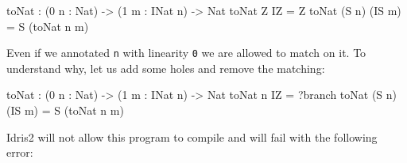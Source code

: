 \documentclass[
]{article}
\newenvironment{Shaded}{}{}
\newcommand{\DataTypeTok}[1]{\textcolor[rgb]{0.56,0.13,0.00}{#1}}
\newcommand{\DecValTok}[1]{\textcolor[rgb]{0.25,0.63,0.44}{#1}}
\newcommand{\NormalTok}[1]{#1}
\newcommand{\OperatorTok}[1]{\textcolor[rgb]{0.40,0.40,0.40}{#1}}
\newcommand{\OtherTok}[1]{\textcolor[rgb]{0.00,0.44,0.13}{#1}}
\begin{document}
\begin{Shaded}
\begin{Highlighting}[]
\NormalTok{toNat }\OperatorTok{:}\NormalTok{ (}\DecValTok{0}\NormalTok{ n }\OperatorTok{:} \DataTypeTok{Nat}\NormalTok{) }\OtherTok{{-}\textgreater{}}\NormalTok{ (}\DecValTok{1}\NormalTok{ m }\OperatorTok{:} \DataTypeTok{INat}\NormalTok{ n) }\OtherTok{{-}\textgreater{}} \DataTypeTok{Nat}
\NormalTok{toNat }\DataTypeTok{Z} \DataTypeTok{IZ} \OtherTok{=} \DataTypeTok{Z}
\NormalTok{toNat (}\DataTypeTok{S}\NormalTok{ n) (}\DataTypeTok{IS}\NormalTok{ m) }\OtherTok{=} \DataTypeTok{S}\NormalTok{ (toNat n m)}
\end{Highlighting}
\end{Shaded}

Even if we annotated \texttt{n} with linearity \texttt{0} we are allowed
to match on it. To understand why, let us add some holes and remove the
matching:

\begin{Shaded}
\begin{Highlighting}[]
\NormalTok{toNat }\OperatorTok{:}\NormalTok{ (}\DecValTok{0}\NormalTok{ n }\OperatorTok{:} \DataTypeTok{Nat}\NormalTok{) }\OtherTok{{-}\textgreater{}}\NormalTok{ (}\DecValTok{1}\NormalTok{ m }\OperatorTok{:} \DataTypeTok{INat}\NormalTok{ n) }\OtherTok{{-}\textgreater{}} \DataTypeTok{Nat}
\NormalTok{toNat n }\DataTypeTok{IZ} \OtherTok{=} \OperatorTok{?}\NormalTok{branch}
\NormalTok{toNat (}\DataTypeTok{S}\NormalTok{ n) (}\DataTypeTok{IS}\NormalTok{ m) }\OtherTok{=} \DataTypeTok{S}\NormalTok{ (toNat n m)}
\end{Highlighting}
\end{Shaded}

Idris2 will not allow this program to compile and will fail with the
following error:
\end{document}
